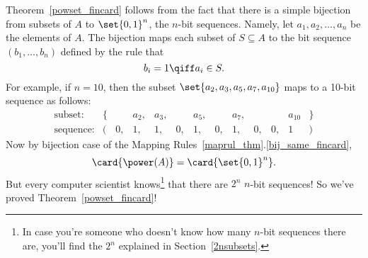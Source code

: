 Theorem~\ref{powset_fincard} follows from the fact that there is a
simple bijection from subsets of $A$ to $\set{0,1}^n$, the $n$-bit
sequences.  Namely, let $a_1, a_2, \dots, a_n$ be the elements of $A$.
The bijection maps each subset of $S \subseteq A$ to the bit sequence
$(b_1, \dots, b_n)$ defined by the rule that
\[
b_i = 1 \qiff a_i \in S.
\]
For example, if $n = 10$, then the subset $\set{a_2, a_3, a_5, a_7,
  a_{10}}$ maps to a 10-bit sequence as follows: %
\[
\begin{array}{rrrrrrrrrrrrr}
\text{subset:} & \{ & & a_2, & a_3, & & a_5, & & a_7, & & & a_{10} &
\} \\ \text{sequence:} & ( & 0, & 1, & 1, & 0, & 1, & 0, & 1, & 0, &
0, & 1 & )
\end{array}
\]
Now by bijection case of the Mapping Rules~\ref{maprul_thm}.\eqref{bij_same_fincard},
\[
\card{\power(A)} = \card{\set{0,1}^n}.
\]
But every computer scientist knows\footnote{In case you're someone who
  doesn't know how many $n$-bit sequences there are, you'll find the
  $2^n$ explained in Section~\ref{2nsubsets}.}
  that there are $2^n$ $n$-bit sequences!  So we've proved
  Theorem~\ref{powset_fincard}!

\begin{problems}
\practiceproblems
{}

\classproblems
{}

\end{problems}

\endinput
